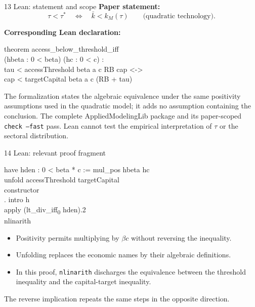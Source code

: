 \documentclass[aspectratio=169,11pt]{beamer}
\begin{document}
\begin{frame}{13 \textperiodcentered{} Lean: statement and scope}
\small
\textbf{Paper statement:}
\[
\tau<\tau^*
\quad\Longleftrightarrow\quad
\bar k<k_M(\tau)
\qquad\text{(quadratic technology).}
\]

\textbf{Corresponding Lean declaration:}
\begin{block}{}
\ttfamily
theorem access\_below\_threshold\_iff\\
\quad (hbeta : 0 < beta) (hc : 0 < c) :\\
\quad tau < accessThreshold beta a c RB cap <->\\
\qquad cap < targetCapital beta a c (RB + tau)
\end{block}

The formalization states the algebraic equivalence under the same positivity
assumptions used in the quadratic model; it adds no assumption containing the
conclusion. The complete AppliedModelingLib package and its paper-scoped
\texttt{check --fast} pass. Lean cannot test the empirical interpretation of
$\tau$ or the sectoral distribution.
\end{frame}

\begin{frame}{14 \textperiodcentered{} Lean: relevant proof fragment}
\small
\begin{block}{}
\ttfamily
have hden : 0 < beta * c := mul\_pos hbeta hc\\
unfold accessThreshold targetCapital\\
constructor\\
\quad . intro h\\
\qquad apply (lt\_div\_iff\textsubscript{0} hden).2\\
\qquad nlinarith
\end{block}

\begin{itemize}
  \item Positivity permits multiplying by $\beta c$ without reversing the inequality.
  \item Unfolding replaces the economic names by their algebraic definitions.
  \item In this proof, \texttt{nlinarith} discharges the equivalence between
        the threshold inequality and the capital-target inequality.
\end{itemize}

\medskip
The reverse implication repeats the same steps in the opposite direction.
\end{frame}
\end{document}
